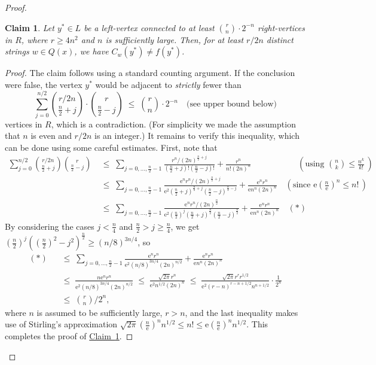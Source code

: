 \documentclass[11pt]{article}
\numberwithin{equation}{section}
\newtheorem{claim}[theorem]{Claim}
\theoremstyle{definition}
\theoremstyle{plain}
\newcommand{\eee}{\mathrm e}
\newcommand{\expref}[2]{\hyperref[#2]{#1~\ref{#2}}}
\begin{document}
\begin{proof}
\begin{claim}\label{c:y_is_good}
Let $y^* \in L$ be a left-vertex connected to at least $\binom{r}{n} \cdot 2^{-n}$ right-vertices in $R$, where $r \geq 4n^2$ and $n$ is sufficiently large. Then, for at least $r/2n$ distinct strings $w \in Q(x)$, we have $C_w(y^*) \neq f(y^*)$.  
\end{claim}

\begin{proof}
  The claim follows using a standard counting argument. If the conclusion were false, the vertex $y^*$ would be
%
adjacent   %
to \emph{strictly}
%
fewer  %
than
%
%
%
$$
\sum_{j = 0}^{n/2} \binom{r/2n}{\frac{n}{2} + j} \cdot \binom{r}{\frac{n}{2} - j} \; \leq \; \binom{r}{n} \cdot 2^{-n} \quad
%
\text{(see upper bound below)} %
$$
vertices in $R$, which is %
a contradiction.  %
(For simplicity we made the assumption that $n$ is even and $r/2n$ is an integer.)  %
It remains to verify this inequality, which can be done using some careful estimates. First, note that
\begin{equation*} 
\begin{split}
\sum_{j=0}^{n/2}\binom{r/2n}{\frac{n}{2}+j}\binom{r}{\frac{n}{2}-j} & \;\le\; \sum_{j=0,\dots,\frac{n}{2}-1}\frac{r^n/(2n)^{\frac{n}{2}+j}}{(\frac{n}{2}+j)!(\frac{n}{2}-j)!}+\frac{r^n}{n!(2n)^n}\quad\quad\quad\quad\quad \;\;(\text{using }\binom{n}{k}\le \frac{n^k}{k!}\,)\\
& \;\le\; \sum_{j=0,\dots,\frac{n}{2}-1}\frac{\eee^nr^n/(2n)^{\frac{n}{2}+j}}{\eee^2(\frac{n}{2}+j)^{\frac{n}{2}+j}(\frac{n}{2}-j)^{\frac{n}{2}-j}}+\frac{\eee^nr^n}{\eee n^n(2n)^n} \quad (\text{since }\eee\!\left (\frac{n}{\eee} \right)^n\le n!\,) \\
& \;\le\; \sum_{j=0,\dots,\frac{n}{2}-1}\frac{\eee^nr^n/(2n)^{\frac{n}{2}}}{\eee^2(\frac{n}{2})^j(\frac{n}{2}+j)^{\frac{n}{2}}(\frac{n}{2}-j)^{\frac{n}{2}}}+\frac{\eee^nr^n}{\eee n^n(2n)^n} \quad (*)
\end{split}
\end{equation*}
By considering the cases $j<\frac{n}{4}$ and $\frac{n}{2}>j\ge \frac{n}{4}$, we get $(\frac{n}{2})^j((\frac{n}{2})^2-j^2)^{\frac{n}{2}}\ge (n/8)^{3n/4}$, so
\begin{equation*}
\begin{split}
(*) & \;\;\;\le\; \sum_{j=0,\dots,\frac{n}{2}-1}\frac{\eee^nr^n}{\eee^2(n/8)^{3n/4}(2n)^{n/2}}+\frac{\eee^nr^n}{\eee n^n(2n)^n}\\
& \;\;\;\le\; \frac{n\eee^nr^n}{\eee^2(n/8)^{3n/4}(2n)^{n/2}} \;\le\; \frac{\sqrt{2\pi}r^n}{\eee^2n^{1/2}(2n)^n} \;\le\; \frac{\sqrt{2\pi}r^rr^{1/2}}{\eee^2(r-n)^{r-n+1/2}n^{n+1/2}} \cdot \frac{1}{2^{n}}\\
& \;\;\;\le\; \binom{r}{n}/2^n,
\end{split}
\end{equation*}
where $n$ is assumed to be sufficiently large, $r > n$,  and the last inequality makes use of Stirling's approximation $\sqrt{2\pi}(\frac{n}{\eee})^nn^{1/2}\le n!\le \eee(\frac{n}{\eee})^nn^{1/2}$. This completes the proof of \expref{Claim}{c:y_is_good}.
\end{proof}


\end{proof}
\end{document}
